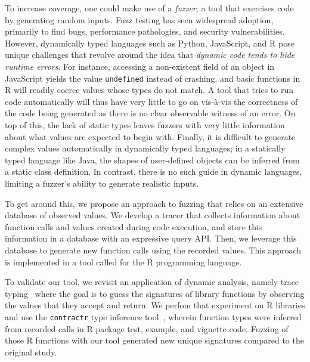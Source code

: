 \documentclass[sigplan,screen]{acmart}
\begin{document}
To increase coverage, one could make use of a \textit{fuzzer}, a tool
that exercises code by generating random inputs.  Fuzz testing has seen widespread adoption, primarily to find bugs,
performance pathologies, and security vulnerabilities.  However,
dynamically typed languages such as Python, JavaScript, and R pose unique
challenges that revolve around the idea that \textit{dynamic code
  tends to hide runtime errors}.  For instance, accessing a non-existent
field of an object in JavaScript yields the value {\tt undefined}
instead of crashing, and basic functions in R will readily coerce
values whose types do not match.  A tool that tries to run code
automatically will thus have very little to go on vis-\`a-vis the
correctness of the code being generated as there is no clear
observable witness of an error. On top of this, the lack of static
types leaves fuzzers with very little information about what values
are expected to begin with. Finally, it is difficult to generate complex
values automatically in dynamically typed languages; in a statically typed language like Java, the
shapes of user-defined objects can be inferred from a static class
definition. In contrast, there is no such guide in dynamic languages, limiting
a fuzzer's ability to generate realistic inputs.

To get around this, we propose an approach to fuzzing that relies on
an extensive database of observed values.  We develop a tracer that
collects information about function calls and values created during
code execution, and store this information in a database with an
expressive query API. Then, we leverage this database to generate
new function calls using the recorded values.  This approach is
implemented in a tool called \tool for the R programming language.

To validate our tool, we revisit an application of dynamic analysis,
namely trace typing~\cite{andreasen2016trace} where the goal is to guess
the signatures of library functions by observing the values that they
accept and return. We perfom that experiment on R libraries and use
the {\tt contractr} type inference tool~\cite{turcotte2020designing},
wherein function types were inferred from recorded calls in R package
test, example, and vignette code.  Fuzzing \UFNumFunctions of those R
functions with our tool generated \UFSignatrSignaturesRnd new unique
signatures compared to the original study.

\end{document}

